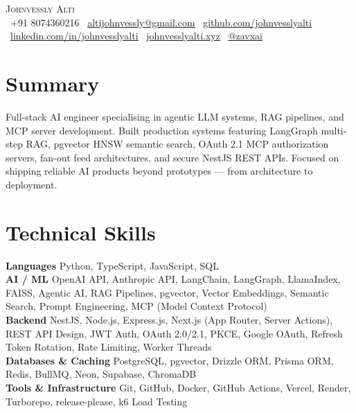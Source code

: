 \documentclass[letterpaper,10pt]{article}
\begin{document}
\begin{center}
    {\Huge \scshape Johnvessly Alti} \\ \vspace{6pt}
    \small
    \faPhone\ +91 8074360216 \quad
    \faEnvelope\ \href{mailto:altijohnvessly@gmail.com}{\underline{altijohnvessly@gmail.com}} \quad
    \faGithub\ \href{https://github.com/johnvesslyalti}{\underline{github.com/johnvesslyalti}} \quad
    \faLinkedin\ \href{https://linkedin.com/in/johnvesslyalti}{\underline{linkedin.com/in/johnvesslyalti}} \quad
    \faGlobe\ \href{https://johnvesslyalti.xyz}{\underline{johnvesslyalti.xyz}} \quad
    \faTwitter\ \href{https://x.com/zavxai}{\underline{@zavxai}}
\end{center}

\vspace{-6pt}

\section{Summary}
\small{
Full-stack AI engineer specialising in agentic LLM systems, RAG pipelines, and MCP server development.
Built production systems featuring LangGraph multi-step RAG, pgvector HNSW semantic search, OAuth 2.1
MCP authorization servers, fan-out feed architectures, and secure NestJS REST APIs. Focused on shipping
reliable AI products beyond prototypes — from architecture to deployment.
}

\vspace{-2pt}

\section{Technical Skills}
 \begin{itemize}[leftmargin=0.15in, label={}]
    \small{\item{
     \textbf{Languages}\hspace{2.5pt} Python, TypeScript, JavaScript, SQL \\[3pt]
     \textbf{AI / ML}\hspace{2.5pt} OpenAI API, Anthropic API, LangChain, LangGraph, LlamaIndex, FAISS, Agentic AI, RAG Pipelines, pgvector, Vector Embeddings, Semantic Search, Prompt Engineering, MCP (Model Context Protocol) \\[3pt]
     \textbf{Backend}\hspace{2.5pt} NestJS, Node.js, Express.js, Next.js (App Router, Server Actions), REST API Design, JWT Auth, OAuth 2.0/2.1, PKCE, Google OAuth, Refresh Token Rotation, Rate Limiting, Worker Threads \\[3pt]
     \textbf{Databases \& Caching}\hspace{2.5pt} PostgreSQL, pgvector, Drizzle ORM, Prisma ORM, Redis, BullMQ, Neon, Supabase, ChromaDB \\[3pt]
     \textbf{Tools \& Infrastructure}\hspace{2.5pt} Git, GitHub, Docker, GitHub Actions, Vercel, Render, Turborepo, release-please, k6 Load Testing \\[3pt]
    }}
 \end{itemize}
\end{document}

